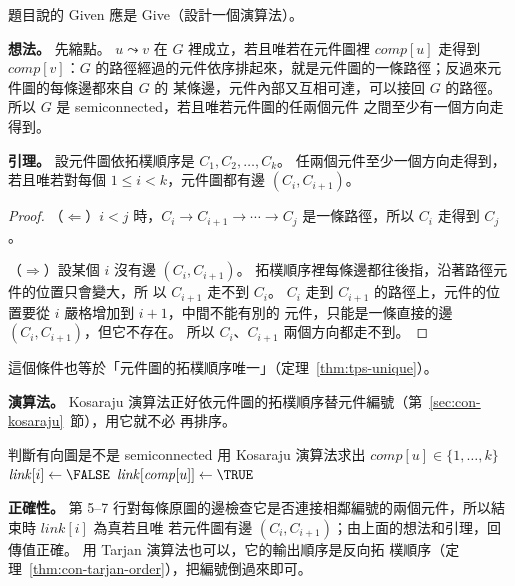 題目說的 Given 應是 Give（設計一個演算法）。

\textbf{想法。} 先縮點。 $u \leadsto v$ 在 $G$ 裡成立，若且唯若在元件圖裡 $\mathit{comp}[u]$ 走得到
$\mathit{comp}[v]$：$G$ 的路徑經過的元件依序排起來，就是元件圖的一條路徑；反過來元件圖的每條邊都來自 $G$ 的
某條邊，元件內部又互相可達，可以接回 $G$ 的路徑。 所以 $G$ 是 semiconnected，若且唯若元件圖的任兩個元件
之間至少有一個方向走得到。

\textbf{引理。} 設元件圖依拓樸順序是 $C_1, C_2, \ldots, C_k$。 任兩個元件至少一個方向走得到，若且唯若對每個
$1 \le i < k$，元件圖都有邊 $(C_i, C_{i+1})$。

\begin{proof}
（$\Leftarrow$）$i < j$ 時，$C_i \to C_{i+1} \to \cdots \to C_j$ 是一條路徑，所以 $C_i$ 走得到 $C_j$。

（$\Rightarrow$）設某個 $i$ 沒有邊 $(C_i, C_{i+1})$。 拓樸順序裡每條邊都往後指，沿著路徑元件的位置只會變大，所
以 $C_{i+1}$ 走不到 $C_i$。 $C_i$ 走到 $C_{i+1}$ 的路徑上，元件的位置要從 $i$ 嚴格增加到 $i + 1$，中間不能有別的
元件，只能是一條直接的邊 $(C_i, C_{i+1})$，但它不存在。 所以 $C_i$、$C_{i+1}$ 兩個方向都走不到。
\end{proof}

這個條件也等於「元件圖的拓樸順序唯一」（定理~\ref{thm:tps-unique}）。

\textbf{演算法。} Kosaraju 演算法正好依元件圖的拓樸順序替元件編號（第~\ref{sec:con-kosaraju}~節），用它就不必
再排序。

\begin{pseudo}[label=alg:con-px-semi]{判斷有向圖是不是 semiconnected}
    \State 用 Kosaraju 演算法求出 $\mathit{comp}[u] \in \{1, \ldots, k\}$ 
        \State $\mathit{link}[i] \gets \FALSE$
    \EndFor
            \State $\mathit{link}[\mathit{comp}[u]] \gets \TRUE$ 
        \EndIf
    \EndFor
            \State \Return \FALSE
        \EndIf
    \EndFor
    \State \Return \TRUE
\EndFunction
\end{pseudo}

\textbf{正確性。} 第 5--7 行對每條原圖的邊檢查它是否連接相鄰編號的兩個元件，所以結束時 $\mathit{link}[i]$ 為真若且唯
若元件圖有邊 $(C_i, C_{i+1})$；由上面的想法和引理，回傳值正確。 用 Tarjan 演算法也可以，它的輸出順序是反向拓
樸順序（定理~\ref{thm:con-tarjan-order}），把編號倒過來即可。

